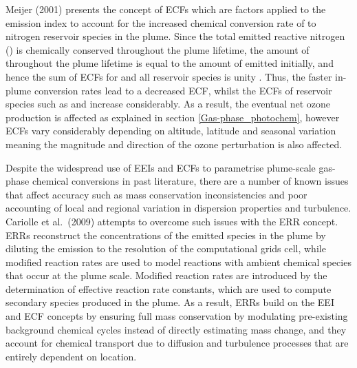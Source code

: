 Meijer (2001) \cite{Meijer2001} presents the concept of ECFs which are factors applied to the  emission index to account for the increased chemical conversion rate of  to nitrogen reservoir species in the plume. Since the total emitted reactive nitrogen () is chemically conserved throughout the plume lifetime, the amount of  throughout the plume lifetime is equal to the amount of  emitted initially, and hence the sum of ECFs for  and all reservoir species is unity \cite{Vohralik2008}. Thus, the faster in-plume conversion rates lead to a decreased  ECF, whilst the ECFs of reservoir species such as  and  increase considerably. As a result, the eventual net ozone production is affected as explained in section \ref{Gas-phase_photochem}, however ECFs vary considerably depending on altitude, latitude and seasonal variation meaning the magnitude and direction of the ozone perturbation is also affected.


Despite the widespread use of EEIs and ECFs to parametrise plume-scale gas-phase chemical conversions in past literature, there are a number of known issues that affect accuracy such as mass conservation inconsistencies and poor accounting of local and regional variation in dispersion properties and turbulence. Cariolle et al.\ (2009) \cite{Cariolle2009} attempts to overcome such issues with the ERR concept. ERRs reconstruct the concentrations of the emitted species in the plume by diluting the emission to the resolution of the computational grids cell, while modified reaction rates are used to model reactions with ambient chemical species that occur at the plume scale. Modified reaction rates are introduced by the determination of effective reaction rate constants, which are used to compute secondary species produced in the plume. As a result, ERRs build on the EEI and ECF concepts by ensuring full mass conservation by modulating pre-existing background chemical cycles instead of directly estimating mass change, and they account for chemical transport due to diffusion and turbulence processes that are entirely dependent on location. 


